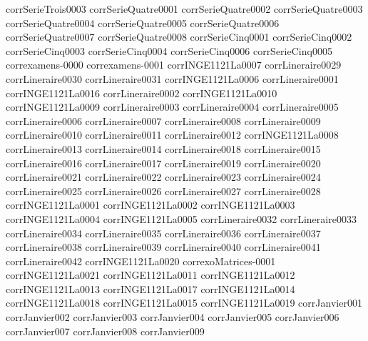 {corrSerieTrois0003}
{corrSerieQuatre0001}
{corrSerieQuatre0002}
{corrSerieQuatre0003}
{corrSerieQuatre0004}
{corrSerieQuatre0005}
{corrSerieQuatre0006}
{corrSerieQuatre0007}
{corrSerieQuatre0008}
{corrSerieCinq0001}
{corrSerieCinq0002}
{corrSerieCinq0003}
{corrSerieCinq0004}
{corrSerieCinq0006}
{corrSerieCinq0005}
{correxamens-0000}
{correxamens-0001}
{corrINGE1121La0007}
{corrLineraire0029}
{corrLineraire0030}
{corrLineraire0031}
{corrINGE1121La0006}
{corrLineraire0001}
{corrINGE1121La0016}
{corrLineraire0002}
{corrINGE1121La0010}
{corrINGE1121La0009}
{corrLineraire0003}
{corrLineraire0004}
{corrLineraire0005}
{corrLineraire0006}
{corrLineraire0007}
{corrLineraire0008}
{corrLineraire0009}
{corrLineraire0010}
{corrLineraire0011}
{corrLineraire0012}
{corrINGE1121La0008}
{corrLineraire0013}
{corrLineraire0014}
{corrLineraire0018}
{corrLineraire0015}
{corrLineraire0016}
{corrLineraire0017}
{corrLineraire0019}
{corrLineraire0020}
{corrLineraire0021}
{corrLineraire0022}
{corrLineraire0023}
{corrLineraire0024}
{corrLineraire0025}
{corrLineraire0026}
{corrLineraire0027}
{corrLineraire0028}
{corrINGE1121La0001}
{corrINGE1121La0002}
{corrINGE1121La0003}
{corrINGE1121La0004}
{corrINGE1121La0005}
{corrLineraire0032}
{corrLineraire0033}
{corrLineraire0034}
{corrLineraire0035}
{corrLineraire0036}
{corrLineraire0037}
{corrLineraire0038}
{corrLineraire0039}
{corrLineraire0040}
{corrLineraire0041}
{corrLineraire0042}
{corrINGE1121La0020}
{correxoMatrices-0001}
{corrINGE1121La0021}
{corrINGE1121La0011}
{corrINGE1121La0012}
{corrINGE1121La0013}
{corrINGE1121La0017}
{corrINGE1121La0014}
{corrINGE1121La0018}
{corrINGE1121La0015}
{corrINGE1121La0019}
{corrJanvier001}
{corrJanvier002}
{corrJanvier003}
{corrJanvier004}
{corrJanvier005}
{corrJanvier006}
{corrJanvier007}
{corrJanvier008}
{corrJanvier009}

